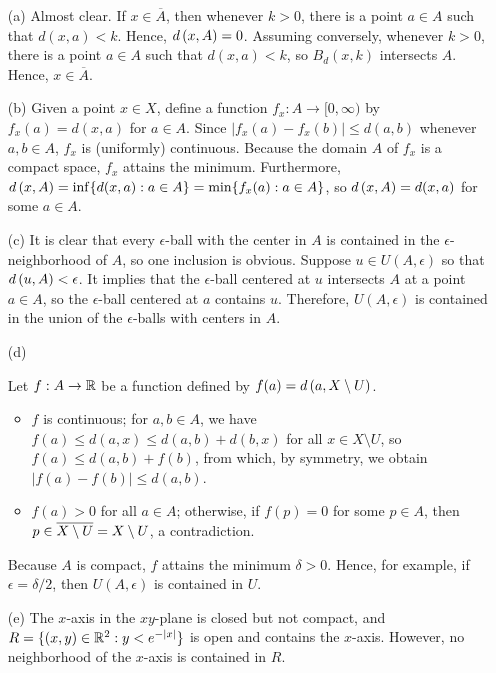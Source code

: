 \begin{sol}
    \begin{enumerate}
        \item[(a)]
        {    
            Almost clear.
            If $x\in\overline{A}$, then whenever $k>0$, there is a point $a\in A$ such that $d(x, a)<k$.
            Hence, ${d}\left({x},{A}\right)=0$.
            Assuming conversely, whenever $k>0$, there is a point $a\in A$ such that $d(x, a)<k$, so $B_d(x, k)$ intersects $A$.
            Hence, $x\in\overline{A}$.
        }
        \item[(b)]
        {
            Given a point $x\in X$, define a function $f_x: A\rightarrow[0, \infty)$ by $f_x(a)=d(x, a)$ for $a\in A$.
            Since $|f_x(a)-f_x(b)|\leq d(a, b)$ whenever $a, b\in A$, $f_x$ is (uniformly) continuous.
            Because the domain $A$ of $f_x$ is a compact space, $f_x$ attains the minimum.
            Furthermore, ${d}\left({x},{A}\right)=\inf\{d(x, a): a\in A\}=\min\{f_x(a): a\in A\}$, so ${d}\left({x},{A}\right)=d(x, a)$ for some $a\in A$.
        }
        \item[(c)]
        {
            It is clear that every $\epsilon$-ball with the center in $A$ is contained in the $\epsilon$-neighborhood of $A$, so one inclusion is obvious.
            Suppose $u\in U(A, \epsilon)$ so that ${d}\left({u},{A}\right)<\epsilon$.
            It implies that the $\epsilon$-ball centered at $u$ intersects $A$ at a point $a\in A$, so the $\epsilon$-ball centered at $a$ contains $u$.
            Therefore, $U(A, \epsilon)$ is contained in the union of the $\epsilon$-balls with centers in $A$.
        }
        \item[(d)]
        {    
            Let $f: A\rightarrow {\mathbb{R}}$ be a function defined by $f(a)={d}\left({a},{X\setminus U}\right)$.
            \begin{itemize}
                \item
                {
                    $f$ is continuous; for $a, b\in A$, we have $f(a)\leq d(a, x)\leq d(a, b)+d(b, x)$ for all $x\in X\setminus U$, so $f(a)\leq d(a, b)+f(b)$, from which, by symmetry, we obtain $|f(a)-f(b)|\leq d(a, b)$.
                }
                \item
                {
                    $f(a)>0$ for all $a\in A$; otherwise, if $f(p)=0$ for some $p\in A$, then $p\in\overline{X\setminus U}=X\setminus U$, a contradiction.
                }
            \end{itemize}
            Because $A$ is compact, $f$ attains the minimum $\delta>0$.
            Hence, for example, if $\epsilon=\delta/2$, then $U(A, \epsilon)$ is contained in $U$.
        }
        \item[(e)]
        {
            The $x$-axis in the $xy$-plane is closed but not compact, and $R=\{(x, y)\in{\mathbb{R}}^2: y<e^{-|x|}\}$ is open and contains the $x$-axis.
            However, no neighborhood of the $x$-axis is contained in $R$.
        }
    \end{enumerate}
\end{sol}

